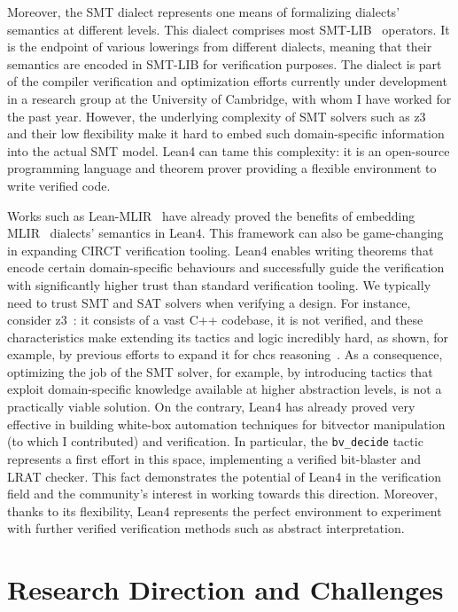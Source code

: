 \documentclass[sigconf,authorversion,nonacm, 11pt]{acmart}
\begin{document}
Moreover, the SMT dialect represents one means of formalizing dialects' semantics at different levels. 
This dialect comprises most SMT-LIB~\cite{barrett2010smt} operators. 
It is the endpoint of various lowerings from different dialects, meaning that their semantics are encoded in SMT-LIB for verification purposes.
The dialect is part of the compiler verification and optimization efforts currently under development in a research group at the University of Cambridge, with whom I have worked for the past year. 
However, the underlying complexity of SMT solvers such as z3~\cite{de2008z3} and their low flexibility make it hard to embed such domain-specific information into the actual SMT model. 
Lean4 can tame this complexity: it is an open-source programming language and theorem prover providing a flexible environment to write verified code. 

Works such as Lean-MLIR~\cite{bhat2024verifying} have already proved the benefits of embedding MLIR~\cite{mlir} dialects' semantics in Lean4.
This framework can also be game-changing in expanding CIRCT verification tooling.
Lean4 enables writing theorems that encode certain domain-specific behaviours and successfully guide the verification with significantly higher trust than standard verification tooling.
We typically need to trust SMT and SAT solvers when verifying a design. 
For instance, consider z3~\cite{de2008z3}: it consists of a vast C++ codebase, it is not verified, and these characteristics make extending its tactics and logic incredibly hard, as shown, for example, by previous efforts to expand it for \acp{chc} reasoning~\cite{gurfinkel2022program}. 
As a consequence, optimizing the job of the SMT solver, for example, by introducing tactics that exploit domain-specific knowledge available at higher abstraction levels, is not a practically viable solution. 
On the contrary, Lean4 has already proved very effective in building white-box automation techniques for bitvector manipulation (to which I contributed) and verification. 
In particular, the \texttt{bv\_decide} tactic~\cite{bvdecide} represents a first effort in this space, implementing a verified bit-blaster and LRAT checker.
This fact demonstrates the potential of Lean4 in the verification field and the community's interest in working towards this direction. 
Moreover, thanks to its flexibility, Lean4 represents the perfect environment to experiment with further verified verification methods such as abstract interpretation.

\section{Research Direction and Challenges}
\end{document}
